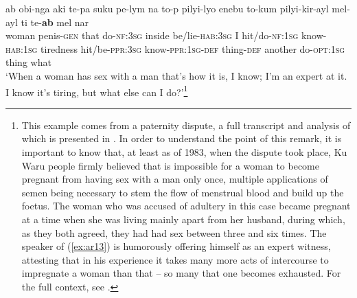 \documentclass[output=paper]{langsci/langscibook}
\begin{document}
\begin{exe}
	\ex \label{ex:ar13}
	\gll ab obi-nga aki te-pa suku pe-lym na to-p pilyi-lyo enebu to-kum pilyi-kir-ayl mel-ayl ti te-\textbf{ab} mel nar\\
	woman penis-\textsc{gen} that do-\textsc{nf}:3\textsc{sg} inside be/lie-\textsc{hab}:3\textsc{sg} I hit/do-\textsc{nf}:1\textsc{sg} know-\textsc{hab}:1\textsc{sg} tiredness hit/be-\textsc{ppr}:3\textsc{sg} know-\textsc{ppr}:1\textsc{sg}-\textsc{def}		thing-\textsc{def} another do-\textsc{opt}:1\textsc{sg} thing what\\
	\trans ‘When a woman has sex with a man that's how it is, I know; I'm an expert at it. I know it’s tiring, but what else can I do?’\footnote{This example comes from a paternity dispute, a full transcript and analysis of which is presented in \cite{MerlanRumsey1986}. In order to understand the point of this remark, it is important to know that, at least as of 1983, when the dispute took place, Ku Waru people firmly believed that is impossible for a woman to become pregnant from having sex with a man only once, multiple applications of semen being necessary to stem the flow of menstrual blood and build up the foetus. The woman who was accused of adultery in this case became pregnant at a time when she was living mainly apart from her husband, during which, as they both agreed, they had had sex between three and six times. The speaker of (\ref{ex:ar13}) is humorously offering himself as an expert witness, attesting that in his experience it takes many more acts of intercourse to impregnate a woman than that – so many that one becomes exhausted. For the full context, see \cite[100]{MerlanRumsey1986}.}
\end{exe}
\end{document}
